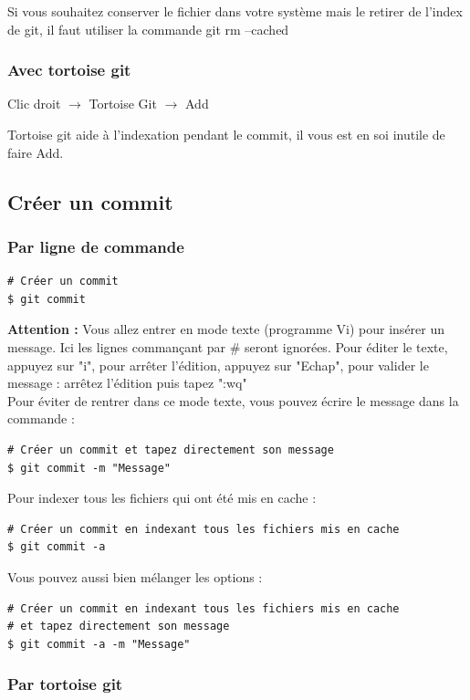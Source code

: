 Si vous souhaitez conserver le fichier dans votre système mais le retirer de l'index de git, il faut utiliser la commande git rm --cached

\subsubsection{Avec tortoise git}
Clic droit $\rightarrow$ Tortoise Git $\rightarrow$ Add

Tortoise git aide à l'indexation pendant le commit, il vous est en soi inutile de faire Add.\\
\newpage
\subsection{Créer un commit}
\subsubsection{Par ligne de commande}
\begin{verbatim}
# Créer un commit
$ git commit
\end{verbatim}

\textbf{Attention : } Vous allez entrer en mode texte (programme Vi) pour insérer un message.
Ici les lignes commançant par \# seront ignorées.
Pour éditer le texte, appuyez sur "i", pour arrêter l'édition, appuyez sur "Echap", pour valider le message :
arrêtez l'édition puis tapez ":wq"\\

Pour éviter de rentrer dans ce mode texte, vous pouvez écrire le message dans la commande :
\begin{verbatim}
# Créer un commit et tapez directement son message
$ git commit -m "Message"
\end{verbatim}

Pour indexer tous les fichiers qui ont été mis en cache :
\begin{verbatim}
# Créer un commit en indexant tous les fichiers mis en cache
$ git commit -a
\end{verbatim}

Vous pouvez aussi bien mélanger les options :
\begin{verbatim}
# Créer un commit en indexant tous les fichiers mis en cache
# et tapez directement son message
$ git commit -a -m "Message"
\end{verbatim}

\subsubsection{Par tortoise git}

